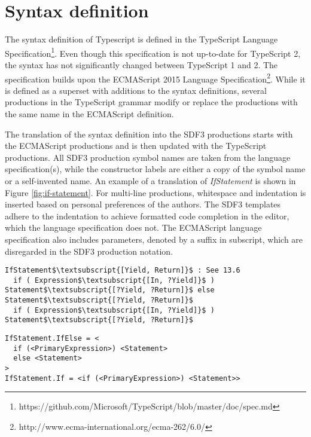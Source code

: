 \section{Syntax definition}
\label{sec:syntax}
The syntax definition of Typescript is defined in the TypeScript Language Specification\footnote{https://github.com/Microsoft/TypeScript/blob/master/doc/spec.md}.
Even though this specification is not up-to-date for TypeScript 2, the syntax has not significantly changed between TypeScript 1 and 2.
The specification builds upon the ECMAScript 2015 Language Specification\footnote{http://www.ecma-international.org/ecma-262/6.0/}.
While it is defined as a superset with additions to the syntax definitions, several productions in the TypeScript grammar modify or replace the productions with the same name in the ECMAScript definition.

The translation of the syntax definition into the SDF3\citep{Vollebregt:2012:DST:2427048.2427056} productions starts with the ECMAScript productions and is then updated with the TypeScript productions.
All SDF3 production symbol names are taken from the language specification(s), while the constructor labels are either a copy of the symbol name or a self-invented name.
An example of a translation of \textit{IfStatement} is shown in Figure \ref{fig:if-statement}.
For multi-line productions, whitespace and indentation is inserted based on personal preferences of the authors.
The SDF3 templates adhere to the indentation to achieve formatted code completion in the editor, which the language specification does not.
The ECMAScript language specification also includes parameters, denoted by a suffix in subscript, which are disregarded in the SDF3 production notation.

\begin{figure*}
  \begin{lstlisting}[caption=Definition of \textit{IfStatement} in the ECMAScript language specification,mathescape]
IfStatement$\textsubscript{[Yield, Return]}$ : See 13.6
  if ( Expression$\textsubscript{[In, ?Yield]}$ ) Statement$\textsubscript{[?Yield, ?Return]}$ else Statement$\textsubscript{[?Yield, ?Return]}$
  if ( Expression$\textsubscript{[In, ?Yield]}$ ) Statement$\textsubscript{[?Yield, ?Return]}$
  \end{lstlisting}
  \begin{lstlisting}[caption=Definition of \textit{IfStatement} in SDF3 production notation]
IfStatement.IfElse = <
  if (<PrimaryExpression>) <Statement>
  else <Statement>
>
IfStatement.If = <if (<PrimaryExpression>) <Statement>>
  \end{lstlisting}
  \caption{The translation of \textit{IfStatement} from the ECMAScript language specification to SDF3 production notation.}
  \label{fig:if-statement}
\end{figure*}

